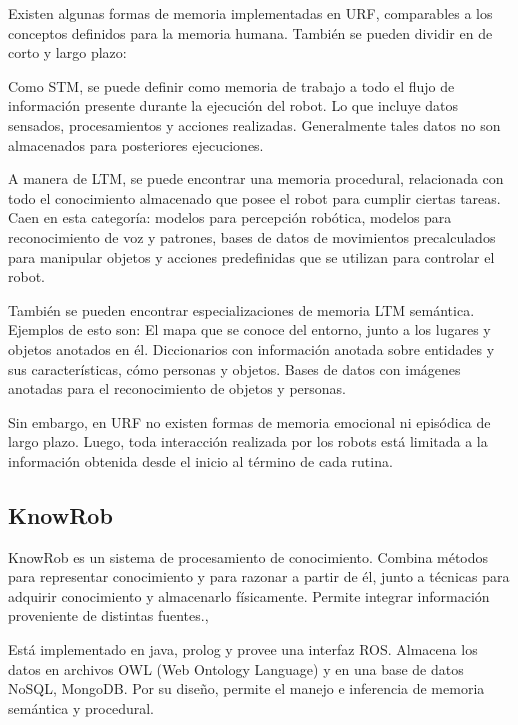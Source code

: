 Existen algunas formas de memoria implementadas en URF, comparables a los conceptos definidos para la memoria humana. También se pueden dividir en de corto y largo plazo:

Como STM, se puede definir como memoria de trabajo a todo el flujo de información presente durante la ejecución del robot. Lo que incluye datos sensados, procesamientos y acciones realizadas. Generalmente tales datos no son almacenados para posteriores ejecuciones.

A manera de LTM, se puede encontrar una memoria procedural, relacionada con todo el conocimiento almacenado que posee el robot para cumplir ciertas tareas. Caen en esta categoría: modelos para percepción robótica, modelos para reconocimiento de voz y patrones, bases de datos de movimientos precalculados para manipular objetos y acciones predefinidas que se utilizan para controlar el robot.

También se pueden encontrar especializaciones de memoria LTM semántica. Ejemplos de esto son: El mapa que se conoce del entorno, junto a los lugares y objetos anotados en él. Diccionarios con información anotada sobre entidades y sus características, cómo personas y objetos. Bases de datos con imágenes anotadas para el reconocimiento de objetos y personas. 

Sin embargo, en URF no existen formas de memoria emocional ni episódica de largo plazo. Luego, toda interacción realizada por los robots está limitada a la información obtenida desde el inicio al término de cada rutina.



\subsection{KnowRob}

KnowRob es un sistema de procesamiento de conocimiento. Combina métodos para representar conocimiento y para razonar a partir de él, junto a técnicas  para adquirir conocimiento y almacenarlo físicamente. Permite integrar información proveniente de distintas fuentes.\cite{Tenorth2013}, \cite{Tenorth2009}

Está implementado en java, prolog y provee una interfaz ROS. Almacena los datos en archivos OWL (Web Ontology Language) y en una base de datos NoSQL, MongoDB. Por su diseño, permite el manejo e inferencia de memoria semántica y procedural.



